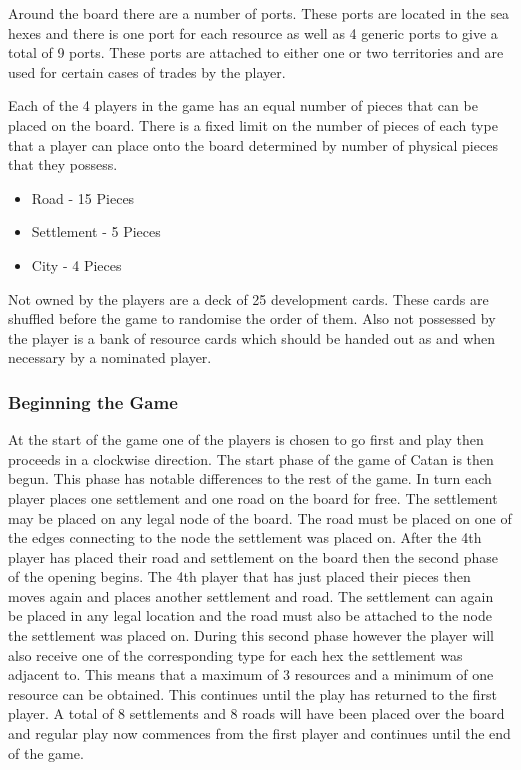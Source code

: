 \documentclass[]{article}
\begin{document}
\par Around the board there are a number of ports. These ports are located in the sea hexes and there is one port for each resource as well as 4 generic ports to give a total of 9 ports. These ports are attached to either one or two territories and are used for certain cases of trades by the player.

\par Each of the 4 players in the game has an equal number of pieces that can be placed on the board. There is a fixed limit on the number of pieces of each type that a player can place onto the board determined by number of physical pieces that they possess. 

\begin{itemize}
  \item Road - 15 Pieces
  \item Settlement - 5 Pieces
  \item City - 4 Pieces
\end{itemize}


\par Not owned by the players are a deck of 25 development cards. These cards are shuffled before the game to randomise the order of them. Also not possessed by the player is a bank of resource cards which should be handed out as and when necessary by a nominated player.

\subsubsection{Beginning the Game}
At the start of the game one of the players is chosen to go first and play then proceeds in a clockwise direction. The start phase of the game of Catan is then begun. This phase has notable differences to the rest of the game. In turn each player places one settlement and one road on the board for free. The settlement may be placed on any legal node of the board. The road must be placed on one of the edges connecting to the node the settlement was placed on. After the 4th player has placed their road and settlement on the board then the second phase of the opening begins. The 4th player that has just placed their pieces then moves again and places another settlement and road. The settlement can again be placed in any legal location and the road must also be attached to the node the settlement was placed on. During this second phase however the player will also receive one of the corresponding type for each hex the settlement was adjacent to. This means that a maximum of 3 resources and a minimum of one resource can be obtained. This continues until the play has returned to the first player. A total of 8 settlements and 8 roads will have been placed over the board and regular play now commences from the first player and continues until the end of the game.
\end{document}
